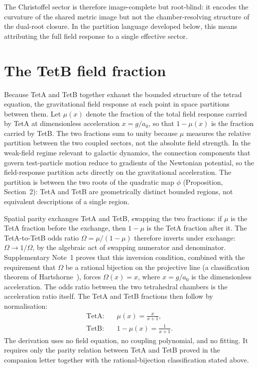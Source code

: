 \documentclass[twocolumn]{iopjournal}
\begin{document}
The Christoffel sector is therefore image-complete but
root-blind: it encodes the curvature of the shared metric image
but not the chamber-resolving structure of the dual-root
closure. In the partition language developed below, this means
attributing the full field response to a single effective
sector.


\section{The TetB field fraction}

Because TetA and TetB together exhaust the bounded structure of
the tetrad equation, the gravitational field response at each
point in space partitions between them. Let $\mu(x)$ denote the
fraction of the total field response carried by TetA at
dimensionless acceleration $x = g/a_0$, so that $1 - \mu(x)$ is
the fraction carried by TetB. The two fractions sum to unity
because $\mu$ measures the relative partition between the two
coupled sectors, not the absolute field strength. In the
weak-field regime relevant to galactic dynamics, the connection
components that govern test-particle motion reduce to gradients
of the Newtonian potential, so the field-response partition acts
directly on the gravitational acceleration. The partition is
between the two roots of the quadratic map $\phi$
(Proposition, Section~2): TetA and TetB are geometrically
distinct bounded regions, not equivalent descriptions of a
single region.

Spatial parity exchanges TetA and TetB, swapping the two
fractions: if $\mu$ is the TetA fraction before the exchange,
then $1 - \mu$ is the TetA fraction after it. The
TetA-to-TetB odds ratio $\Omega = \mu/(1-\mu)$ therefore
inverts under exchange: $\Omega \to 1/\Omega$, by the
algebraic act of swapping numerator and denominator.
Supplementary Note~1 proves that this inversion condition,
combined with the requirement that $\Omega$ be a rational
bijection on the projective line (a classification theorem of
Hartshorne~\cite{Hartshorne1977}), forces $\Omega(x) = x$,
where $x = g/a_0$ is the dimensionless acceleration. The
odds ratio between the two tetrahedral chambers is the
acceleration ratio itself. The TetA and TetB fractions then
follow by normalisation:
\begin{align}
  \text{TetA:} \quad & \mu(x) = \frac{x}{x + 1},
  \label{eq:mu} \\[4pt]
  \text{TetB:} \quad & 1 - \mu(x) = \frac{1}{x + 1}.
  \label{eq:tetb}
\end{align}
The derivation uses no field equation, no coupling polynomial,
and no fitting. It requires only the parity relation between
TetA and TetB proved in the companion letter together with the
rational-bijection classification stated above.
\end{document}
